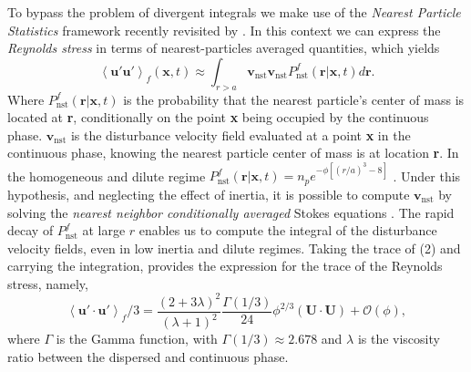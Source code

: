 \documentclass[12pt,a4paper]{article}
\newcommand{\avg}[1]{\left<#1\right>}
\renewcommand{\avg}[1]{\left<#1\right>}
\begin{document}
To bypass the problem of divergent integrals we make use of the  \textit{Nearest Particle Statistics} framework recently revisited by \cite{zhang2021ensemble}. 
In this context we can express the \textit{Reynolds stress} in terms of nearest-particles averaged quantities, which yields
\begin{equation}
    \avg{\textbf{u}'\textbf{u}'}_f(\textbf{x},t)
    \approx
    \int_{r >a}  \textbf{v}_\text{nst}  \textbf{v}_\text{nst} P_\text{nst}^f(\textbf{r}|\textbf{x},t) d\textbf{r}.
    \label{eq:eq2}
\end{equation}
Where $P_\text{nst}^f(\textbf{r}|\textbf{x},t)$ is the probability that the nearest particle's center of mass is located at \textbf{r}, conditionally on the point \textbf{x} being occupied by the continuous phase.
$\textbf{v}_\text{nst}$ is the disturbance velocity field evaluated at a point \textbf{x} in the continuous phase, knowing the nearest particle center of mass is at location \textbf{r}. 
In the homogeneous and dilute regime $P_\text{nst}^f(\textbf{r}|\textbf{x},t) = n_p e^{- \phi [(r/a)^3 - 8]}$ \cite{zhang2021ensemble}.
Under this hypothesis, and neglecting the effect of inertia, it is possible to compute $\textbf{v}_\text{nst}$ by solving the \textit{nearest neighbor conditionally averaged} Stokes equations \cite{zhang2021ensemble}. 
The rapid decay of $P_\text{nst}^f$ at large $r$ enables us to compute the integral of the disturbance velocity fields, even in low inertia and dilute regimes. 
Taking the trace of (2) and carrying the integration, provides the expression for the trace of the Reynolds stress, namely,
\begin{equation}
    \avg{\textbf{u}'\cdot \textbf{u}'}_f/3
    = \frac{(2+3\lambda)^2}{(\lambda+1)^2}\frac{\Gamma(1/3)}{24} 
        \phi^{2/3}
        (\textbf{U}\cdot \textbf{U})
        + \mathcal{O}(\phi),
        \label{eq:results}
\end{equation}
where %
$\Gamma$ is the Gamma function, with $\Gamma(1/3) \approx 2.678$ and $\lambda$ is the viscosity ratio between the dispersed and continuous phase.
\end{document}
